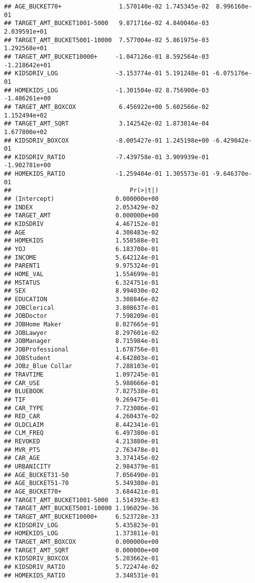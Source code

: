 \documentclass[
]{article}
\begin{document}
\begin{verbatim}
## AGE_BUCKET70+                1.570140e-02 1.745345e-02  8.996160e-01
## TARGET_AMT_BUCKET1001-5000   9.871716e-02 4.840046e-03  2.039591e+01
## TARGET_AMT_BUCKET5001-10000  7.577004e-02 5.861975e-03  1.292568e+01
## TARGET_AMT_BUCKET10000+     -1.047126e-01 8.592564e-03 -1.218642e+01
## KIDSDRIV_LOG                -3.153774e-01 5.191248e-01 -6.075176e-01
## HOMEKIDS_LOG                -1.301504e-02 8.756900e-03 -1.486261e+00
## TARGET_AMT_BOXCOX            6.456922e+00 5.602566e-02  1.152494e+02
## TARGET_AMT_SQRT              3.142542e-02 1.873014e-04  1.677800e+02
## KIDSDRIV_BOXCOX             -8.005427e-01 1.245198e+00 -6.429042e-01
## KIDSDRIV_RATIO              -7.439758e-01 3.909939e-01 -1.902781e+00
## HOMEKIDS_RATIO              -1.259404e-01 1.305573e-01 -9.646370e-01
##                                 Pr(>|t|)
## (Intercept)                 0.000000e+00
## INDEX                       2.053429e-02
## TARGET_AMT                  0.000000e+00
## KIDSDRIV                    4.467152e-01
## AGE                         4.308483e-02
## HOMEKIDS                    1.558588e-01
## YOJ                         6.183708e-01
## INCOME                      5.642124e-01
## PARENT1                     9.975324e-01
## HOME_VAL                    1.554699e-01
## MSTATUS                     6.324751e-01
## SEX                         8.994030e-02
## EDUCATION                   3.308846e-02
## JOBClerical                 3.808637e-01
## JOBDoctor                   7.598209e-01
## JOBHome Maker               8.027665e-01
## JOBLawyer                   8.297601e-02
## JOBManager                  8.715984e-01
## JOBProfessional             1.678756e-01
## JOBStudent                  4.642803e-01
## JOBz_Blue Collar            7.288103e-01
## TRAVTIME                    1.097245e-01
## CAR_USE                     5.988666e-01
## BLUEBOOK                    7.827538e-01
## TIF                         9.269475e-01
## CAR_TYPE                    7.723086e-01
## RED_CAR                     4.260437e-02
## OLDCLAIM                    8.442341e-01
## CLM_FREQ                    6.497380e-01
## REVOKED                     4.213880e-01
## MVR_PTS                     2.763478e-01
## CAR_AGE                     3.374145e-02
## URBANICITY                  2.984379e-01
## AGE_BUCKET31-50             7.056490e-01
## AGE_BUCKET51-70             5.349380e-01
## AGE_BUCKET70+               3.684421e-01
## TARGET_AMT_BUCKET1001-5000  1.514393e-83
## TARGET_AMT_BUCKET5001-10000 1.196029e-36
## TARGET_AMT_BUCKET10000+     6.523728e-33
## KIDSDRIV_LOG                5.435823e-01
## HOMEKIDS_LOG                1.373811e-01
## TARGET_AMT_BOXCOX           0.000000e+00
## TARGET_AMT_SQRT             0.000000e+00
## KIDSDRIV_BOXCOX             5.203662e-01
## KIDSDRIV_RATIO              5.722474e-02
## HOMEKIDS_RATIO              3.348531e-01
\end{verbatim}
\end{document}
